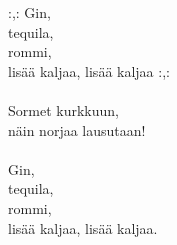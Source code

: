 
:,: Gin, \\ tequila, \\ rommi, \\ lisää kaljaa, lisää kaljaa :,: \\ \hspace{10mm} \\ Sormet kurkkuun, \\ näin norjaa lausutaan! \\ \hspace{10mm} \\ Gin, \\ tequila, \\ rommi, \\ lisää kaljaa, lisää kaljaa.